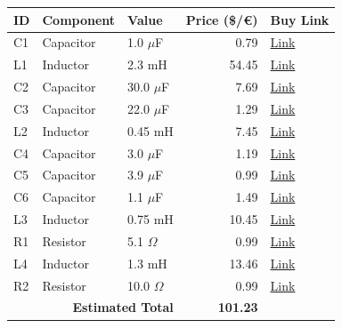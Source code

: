 \begin{table}[H]
    \centering
    \renewcommand{\arraystretch}{1.5}
    \begin{tabular}{@{}lllrl@{}}
        \toprule
        \textbf{ID} & \textbf{Component} & \textbf{Value} & \textbf{Price (\$/€)} & \textbf{Buy Link} \\
        \midrule
        C1 & Capacitor & 1.0 $\mu$F & 0.79 & \href{https://www.parts-express.com/Dayton-Audio-PMPC-1.0-1.0uF-250V-Precision-Audio-Capacitor-027-210}{Link} \\
        L1 & Inductor & 2.3 mH & 54.45 & \href{https://www.soundimports.eu/en/jantzen-audio-000-8690.html}{Link} \\
        C2 & Capacitor & 30.0 $\mu$F & 7.69 & \href{https://www.parts-express.com/Solen-30uF-400V-Polypropylene-Capacitor-027-590}{Link} \\
        C3 & Capacitor & 22.0 $\mu$F & 1.29 & \href{https://www.parts-express.com/22uF-100V-Non-Polarized-Capacitor-027-348}{Link} \\
        L2 & Inductor & 0.45 mH & 7.45 & \href{https://www.soundimports.eu/en/jantzen-audio-000-2367.html}{Link} \\
        C4 & Capacitor & 3.0 $\mu$F & 1.19 & \href{https://www.parts-express.com/Solen-3.0uF-400V-Polypropylene-Capacitor-027-542}{Link} \\
        C5 & Capacitor & 3.9 $\mu$F & 0.99 & \href{https://www.soundimports.eu/en/jantzen-audio-001-6020.html}{Link} \\
        C6 & Capacitor & 1.1 $\mu$F & 1.49 & \href{https://www.soundimports.eu/en/jantzen-audio-001-0232.html}{Link} \\
        L3 & Inductor & 0.75 mH & 10.45 & \href{https://www.soundimports.eu/en/jantzen-audio-000-1075.html}{Link} \\
        R1 & Resistor & 5.1 $\Omega$ & 0.99 & \href{https://www.soundimports.eu/en/jantzen-audio-002-0781.html}{Link} \\
        L4 & Inductor & 1.3 mH & 13.46 & \href{https://www.soundimports.eu/en/jantzen-audio-000-5005.html}{Link} \\
        R2 & Resistor & 10.0 $\Omega$ & 0.99 & \href{https://www.soundimports.eu/en/jantzen-audio-002-0802.html}{Link} \\
        \midrule
        \multicolumn{3}{r}{\textbf{Estimated Total}} & \textbf{101.23} & \\
        \bottomrule
    \end{tabular}
\end{table}
